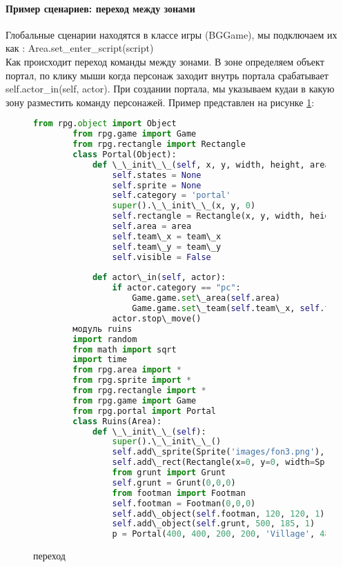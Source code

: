 \paragraph{Пример сценариев: переход между зонами}
Глобальные сценарии находятся в классе игры (BGGame), мы подключаем их как :
Area.set\_enter\_script(script)\\
Как происходит переход команды между зонами.
В зоне определяем объект портал, по клику мыши когда персонаж заходит внутрь портала срабатывает self.actor\_in(self, actor). При создании портала, мы указываем кудаи в какую зону разместить команду персонажей.
Пример представлен на рисунке \ref{portal:image}:
\begin{figure}[H]
	\begin{lstlisting}[language=Python]
		from rpg.object import Object
		from rpg.game import Game
		from rpg.rectangle import Rectangle	
		class Portal(Object):
			def \_\_init\_\_(self, x, y, width, height, area, team\_x, team\_y):
				self.states = None
				self.sprite = None
				self.category = 'portal'
				super().\_\_init\_\_(x, y, 0)
				self.rectangle = Rectangle(x, y, width, height)
				self.area = area
				self.team\_x = team\_x
				self.team\_y = team\_y
				self.visible = False
			
			def actor\_in(self, actor):
				if actor.category == "pc":
					Game.game.set\_area(self.area)
					Game.game.set\_team(self.team\_x, self.team\_y, 100)
				actor.stop\_move()		
		модуль ruins
		import random
		from math import sqrt
		import time
		from rpg.area import *
		from rpg.sprite import *
		from rpg.rectangle import *
		from rpg.game import Game
		from rpg.portal import Portal
		class Ruins(Area):
			def \_\_init\_\_(self):
				super().\_\_init\_\_()
				self.add\_sprite(Sprite('images/fon3.png'), 590, 400, 0)
				self.add\_rect(Rectangle(x=0, y=0, width=Sprite('images/fon3.png').image.width(), height=Sprite('images/fon3.png').image.height()))
				from grunt import Grunt
				self.grunt = Grunt(0,0,0)
				from footman import Footman
				self.footman = Footman(0,0,0)
				self.add\_object(self.footman, 120, 120, 1)
				self.add\_object(self.grunt, 500, 185, 1)
				p = Portal(400, 400, 200, 200, 'Village', 480, 100)
	\end{lstlisting}  
	\caption{переход}
	\label{portal:image}
\end{figure}

